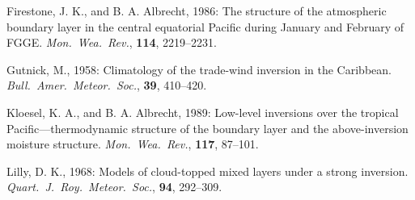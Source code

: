 \begin{references}
Firestone, J. K., and B. A. Albrecht, 1986:  The structure of the atmospheric
boundary layer in the central equatorial Pacific during January and February
of FGGE.  {\sl Mon.\ Wea.\ Rev.}, {\bf 114}, 2219--2231.

Gutnick, M., 1958: Climatology of the trade-wind inversion in the Caribbean.
{\sl Bull.\ Amer.\ Meteor.\ Soc.}, {\bf 39}, 410--420.









Kloesel, K. A., and B. A. Albrecht, 1989:  Low-level inversions over the
tropical Pacific---ther\-mo\-dy\-nam\-ic structure of the boundary layer and
the above-inversion moisture structure. {\sl Mon.\ Wea.\ Rev.}, {\bf 117},
87--101.

Lilly, D. K., 1968:  Models of cloud-topped mixed layers under a strong
inversion. {\sl Quart.\ J.\ Roy.\ Meteor.\ Soc.}, {\bf 94}, 292--309.


\end{references}
